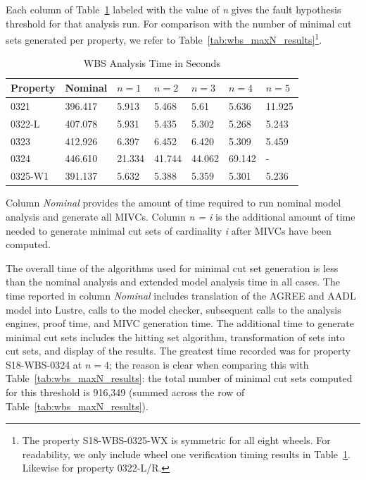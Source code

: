 Each column of Table~\ref{tab:wbs_mincut} labeled with the value of \textit{n} gives the fault hypothesis threshold for that analysis run. For comparison with the number of minimal cut sets generated per property, we refer to Table~\ref{tab:wbs_maxN_results}\footnote{The property S18-WBS-0325-WX is symmetric for all eight wheels. For readability, we only include wheel one verification timing results in Table~\ref{tab:wbs_mincut}. Likewise for property 0322-L/R.}.
\begin{table}[htbp]
\begin{center}
    \begin{tabular}{ | l | l | l | l | l | l | l |}
    \hline
    \textbf{Property} &  Nominal & $n=1$ & $n=2$ & $n=3$ & $n=4$ & $n=5$     \\ \hline \hline
    0321 & 396.417 & 5.913 & 5.468 & 5.61 & 5.636 & 11.925  \\ \hline
    0322-L  & 407.078 & 5.931 & 5.435 & 5.302 & 5.268 & 5.243 \\ \hline
    0323 & 412.926 & 6.397 & 6.452 & 6.420  & 5.309 & 5.459\\ \hline
    0324 & 446.610 & 21.334 & 41.744 & 44.062 & 69.142 & -\\ \hline
    0325-W1 & 391.137 & 5.632 & 5.388 &5.359 &5.301 & 5.236 \\ \hline
    \end{tabular}
    \caption{WBS Analysis Time in Seconds}
    \label{tab:wbs_mincut}
    \end{center}
\end{table}

Column {\em Nominal} provides the amount of time required to run nominal model analysis and generate all MIVCs. Column {\em n = i} is the additional amount of time needed to generate minimal cut sets of cardinality {\em i} after MIVCs have been computed.

The overall time of the algorithms used for minimal cut set generation is less than the nominal analysis and extended model analysis time in all cases. The time reported in column {\em Nominal} includes translation of the AGREE and AADL model into Lustre, calls to the model checker, subsequent calls to the analysis engines, proof time, and MIVC generation time. The additional time to generate minimal cut sets includes the hitting set algorithm, transformation of sets into cut sets, and display of the results. The greatest time recorded was for property S18-WBS-0324 at $n = 4$; the reason is clear when comparing this with Table~\ref{tab:wbs_maxN_results}: the total number of minimal cut sets computed for this threshold is 916,349 (summed across the row of Table~\ref{tab:wbs_maxN_results}). 
 
